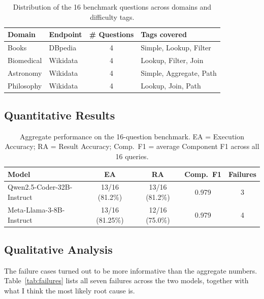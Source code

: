 \documentclass[11pt,a4paper]{article}
\begin{document}
\begin{table}[H]
    \centering
    \begin{tabularx}{\linewidth}{l l c X}
        \toprule
        \textbf{Domain} & \textbf{Endpoint} & \textbf{\# Questions}
                       & \textbf{Tags covered} \\
        \midrule
        Books        & DBpedia  & 4 & Simple, Lookup, Filter \\
        Biomedical   & Wikidata & 4 & Lookup, Filter, Join \\
        Astronomy    & Wikidata & 4 & Simple, Aggregate, Path \\
        Philosophy   & Wikidata & 4 & Lookup, Join, Path \\
        \bottomrule
    \end{tabularx}
    \caption{Distribution of the 16 benchmark questions across
    domains and difficulty tags.}
    \label{tab:question-set}
\end{table}

\subsection{Quantitative Results}
\label{sec:eval-quant}

\begin{table}[H]
    \centering
    \begin{tabularx}{\linewidth}{l c c c c}
        \toprule
        \textbf{Model} & \textbf{EA} & \textbf{RA}
                       & \textbf{Comp.\ F1} & \textbf{Failures} \\
        \midrule
        Qwen2.5-Coder-32B-Instruct  & 13/16 (81.2\%)
                                    & 13/16 (81.2\%)
                                    & 0.979 & 3 \\
        Meta-Llama-3-8B-Instruct    & 13/16 (81.25\%)
                                    & 12/16 (75.0\%)
                                    & 0.979 & 4 \\
        \bottomrule
    \end{tabularx}
    \caption{Aggregate performance on the 16-question benchmark.
    EA = Execution Accuracy; RA = Result Accuracy;
    Comp.\ F1 = average Component F1 across all 16 queries.}
    \label{tab:arena-results}
\end{table}

\subsection{Qualitative Analysis}
\label{sec:eval-qual}
The failure cases turned out to be more informative than the
aggregate numbers. Table~\ref{tab:failures} lists all seven failures
across the two models, together with what I think the most likely
root cause is.
\end{document}
